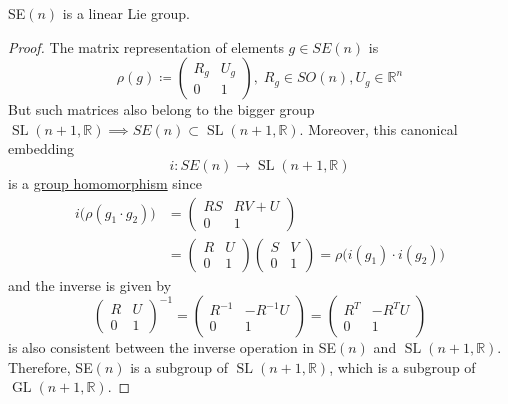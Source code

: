 \documentclass{article}
\DeclareMathOperator{\GL}{GL}
\DeclareMathOperator{\SL}{SL}
\newcounter{theorem}[section]
\begin{document}
    \begin{theorem}
      \label{thm:sen-is-a-linear-lie-group}
      SE$(n)$ is a linear Lie group. 
    \end{theorem}
    \begin{proof}
      The matrix representation of elements $g \in SE(n)$ is 
      \begin{equation}
        \rho(g) \coloneqq \begin{pmatrix}
        R_g & U_g \\ 0 & 1
        \end{pmatrix}, \; R_g \in SO(n), U_g \in \mathbb{R}^n
      \end{equation}
      But such matrices also belong to the bigger group $\SL(n+1, \mathbb{R}) \implies SE(n) \subset \SL(n+1, \mathbb{R})$. Moreover, this canonical embedding 
      \begin{equation}
        i: SE(n) \rightarrow \SL(n+1, \mathbb{R})
      \end{equation}
      is a \hyperref[alg-def:group-homomorphism]{group homomorphism} since
      \begin{align*}
        i\big( \rho(g_1 \cdot g_2) \big) & = \begin{pmatrix}
        RS & RV + U \\ 0 & 1
        \end{pmatrix} \\
        & = \begin{pmatrix}
        R & U \\ 0 & 1
        \end{pmatrix} \begin{pmatrix}
        S & V \\ 0 & 1
        \end{pmatrix} = \rho \big( i(g_1) \cdot i(g_2) \big) 
      \end{align*}
      and the inverse is given by 
      \begin{equation}
        \begin{pmatrix}
        R & U \\ 0 & 1
        \end{pmatrix}^{-1} = \begin{pmatrix}
        R^{-1} & - R^{-1} U \\ 0 & 1
        \end{pmatrix} = \begin{pmatrix}
        R^T & - R^T U \\ 0 & 1
        \end{pmatrix}
      \end{equation}
      is also consistent between the inverse operation in SE$(n)$ and $\SL(n+1, \mathbb{R})$. Therefore, SE$(n)$ is a subgroup of $\SL(n+1, \mathbb{R})$, which is a subgroup of $\GL(n+1, \mathbb{R})$. 
    \end{proof}
\end{document}
